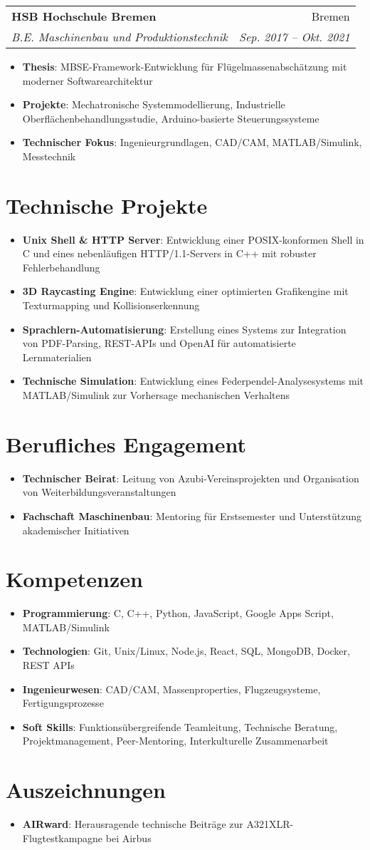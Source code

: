 \documentclass[letterpaper,11pt]{article}
\makeatletter
\newcommand{\resumeItem}[2]{
  \item\small{
    \textbf{#1}{: #2 \vspace{-2pt}}
  }
}
\newcommand{\resumeSubheading}[4]{%
  \vspace{-1pt}\item%
    \begin{tabular*}{0.97\textwidth}[t]{l@{\extracolsep{\fill}}r}
      \textbf{#1} & #2 \\
      \textit{\small#3} & \textit{\small #4}
    \end{tabular*}\vspace{-5pt}%
}
\newcommand{\resumeSubItem}[2]{\resumeItem{#1}{#2}\vspace{-4pt}}
\newcommand{\resumeSubHeadingListStart}{\begin{itemize}[leftmargin=*,label={}]}
\newcommand{\resumeSubHeadingListStartBullets}{\begin{itemize}[leftmargin=*]}
\newcommand{\resumeSubHeadingListEnd}{\end{itemize}}
\newcommand{\resumeItemListStart}{\begin{itemize}}
\newcommand{\resumeItemListEnd}{\end{itemize}}
\makeatother
\begin{document}
\resumeSubheading
{HSB Hochschule Bremen}{Bremen}
{B.E. Maschinenbau und Produktionstechnik}{Sep. 2017 -- Okt. 2021}
\resumeItemListStart
\resumeItem{Thesis}{MBSE-Framework-Entwicklung für Flügelmassenabschätzung mit moderner Softwarearchitektur}
\resumeItem{Projekte}{Mechatronische Systemmodellierung, Industrielle Oberflächenbehandlungsstudie, Arduino-basierte Steuerungssysteme}
\resumeItem{Technischer Fokus}{Ingenieurgrundlagen, CAD/CAM, MATLAB/Simulink, Messtechnik}
\resumeItemListEnd

\section{Technische Projekte}
\resumeSubHeadingListStartBullets
\resumeSubItem{Unix Shell \& HTTP Server}
{Entwicklung einer POSIX-konformen Shell in C und eines nebenläufigen HTTP/1.1-Servers in C++ mit robuster Fehlerbehandlung}
\resumeSubItem{3D Raycasting Engine}
{Entwicklung einer optimierten Grafikengine mit Texturmapping und Kollisionserkennung}
\resumeSubItem{Sprachlern-Automatisierung}
{Erstellung eines Systems zur Integration von PDF-Parsing, REST-APIs und OpenAI für automatisierte Lernmaterialien}
\resumeSubItem{Technische Simulation}
{Entwicklung eines Federpendel-Analysesystems mit MATLAB/Simulink zur Vorhersage mechanischen Verhaltens}
\resumeSubHeadingListEnd

\section{Berufliches Engagement}
\resumeSubHeadingListStartBullets
\resumeSubItem{Technischer Beirat}
{Leitung von Azubi-Vereinsprojekten und Organisation von Weiterbildungsveranstaltungen}
\resumeSubItem{Fachschaft Maschinenbau}
{Mentoring für Erstsemester und Unterstützung akademischer Initiativen}
\resumeSubHeadingListEnd

\section{Kompetenzen}
\resumeSubHeadingListStart
\resumeSubItem{Programmierung}{C, C++, Python, JavaScript, Google Apps Script, MATLAB/Simulink}
\resumeSubItem{Technologien}{Git, Unix/Linux, Node.js, React, SQL, MongoDB, Docker, REST APIs}
\resumeSubItem{Ingenieurwesen}{CAD/CAM, Massenproperties, Flugzeugsysteme, Fertigungsprozesse}
\resumeSubItem{Soft Skills}{Funktionsübergreifende Teamleitung, Technische Beratung, Projektmanagement, Peer-Mentoring, Interkulturelle Zusammenarbeit}
\resumeSubHeadingListEnd

\section{Auszeichnungen}
\resumeSubHeadingListStartBullets
\resumeSubItem{AIRward}
{Herausragende technische Beiträge zur A321XLR-Flugtestkampagne bei Airbus}
\resumeSubHeadingListEnd

\end{document}
